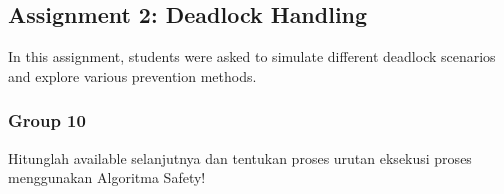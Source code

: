 \documentclass[12pt]{article}
\begin{document}
\subsection{Assignment 2: Deadlock Handling}
In this assignment, students were asked to simulate different deadlock scenarios and explore various prevention methods.
\subsubsection{Group 10}
Hitunglah available selanjutnya dan tentukan proses urutan eksekusi proses menggunakan Algoritma Safety!

\begin{table}[htbp]
    \centering %
    \caption{Table Algoritma sAfety} %
    \label{tab:your_label} %
\end{table}
\end{document}
